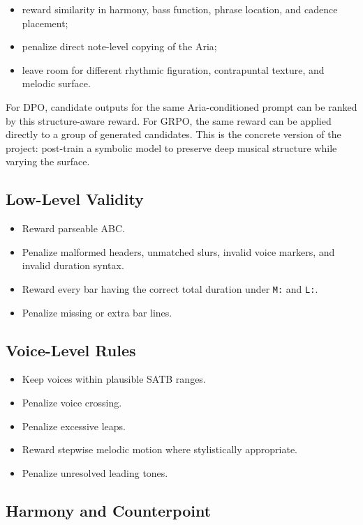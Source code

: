 \documentclass[11pt]{article}
\begin{document}
\begin{itemize}[leftmargin=*]
  \item reward similarity in harmony, bass function, phrase location, and cadence
  placement;
  \item penalize direct note-level copying of the Aria;
  \item leave room for different rhythmic figuration, contrapuntal texture, and
  melodic surface.
\end{itemize}

For DPO, candidate outputs for the same Aria-conditioned prompt can be ranked by
this structure-aware reward. For GRPO, the same reward can be applied directly
to a group of generated candidates. This is the concrete version of the project:
post-train a symbolic model to preserve deep musical structure while varying the
surface.

\subsection{Low-Level Validity}

\begin{itemize}[leftmargin=*]
  \item Reward parseable ABC.
  \item Penalize malformed headers, unmatched slurs, invalid voice markers, and
  invalid duration syntax.
  \item Reward every bar having the correct total duration under \verb|M:| and
  \verb|L:|.
  \item Penalize missing or extra bar lines.
\end{itemize}

\subsection{Voice-Level Rules}

\begin{itemize}[leftmargin=*]
  \item Keep voices within plausible SATB ranges.
  \item Penalize voice crossing.
  \item Penalize excessive leaps.
  \item Reward stepwise melodic motion where stylistically appropriate.
  \item Penalize unresolved leading tones.
\end{itemize}

\subsection{Harmony and Counterpoint}
\end{document}
